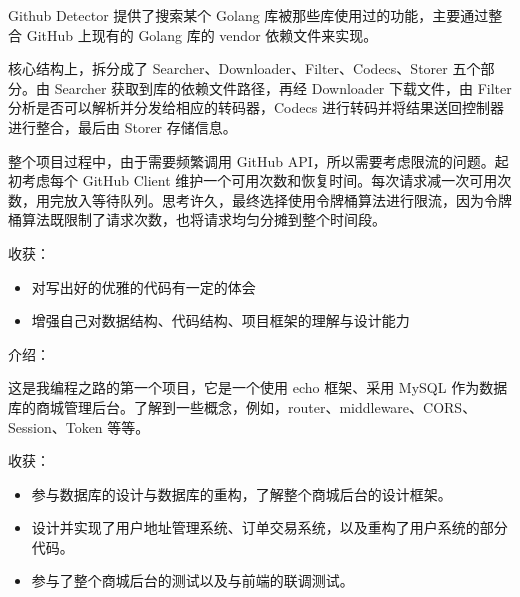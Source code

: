 \documentclass{resume}
\begin{document}
\vspace{1mm}\par
\setlength{\parindent}{2ex}
Github Detector 提供了搜索某个 Golang 库被那些库使用过的功能，主要通过整合 GitHub 上现有的 Golang 库的 vendor 依赖文件来实现。\par
核心结构上，拆分成了 Searcher、Downloader、Filter、Codecs、Storer 五个部分。由 Searcher 获取到库的依赖文件路径，再经 Downloader 下载文件，由 Filter 分析是否可以解析并分发给相应的转码器，Codecs 进行转码并将结果送回控制器进行整合，最后由 Storer 存储信息。\par
整个项目过程中，由于需要频繁调用 GitHub API，所以需要考虑限流的问题。起初考虑每个 GitHub Client 维护一个可用次数和恢复时间。每次请求减一次可用次数，用完放入等待队列。思考许久，最终选择使用令牌桶算法进行限流，因为令牌桶算法既限制了请求次数，也将请求均匀分摊到整个时间段。

\vspace{1mm}\par
\noindent

收获：
\begin{itemize}[parsep=1ex]
	\item 对写出好的优雅的代码有一定的体会
	\item 增强自己对数据结构、代码结构、项目框架的理解与设计能力
\end{itemize}


\vspace{1mm} \par
\noindent
介绍：

\vspace{1mm}\par
\setlength{\parindent}{2ex}
这是我编程之路的第一个项目，它是一个使用 echo 框架、采用 MySQL 作为数据库的商城管理后台。了解到一些概念，例如，router、middleware、CORS、Session、Token 等等。

\vspace{1mm}\par
\noindent
收获：

\begin{itemize}[parsep=1ex]
	\item 参与数据库的设计与数据库的重构，了解整个商城后台的设计框架。
	\item 设计并实现了用户地址管理系统、订单交易系统，以及重构了用户系统的部分代码。
	\item 参与了整个商城后台的测试以及与前端的联调测试。
\end{itemize} \vspace{1mm}
\end{document}
